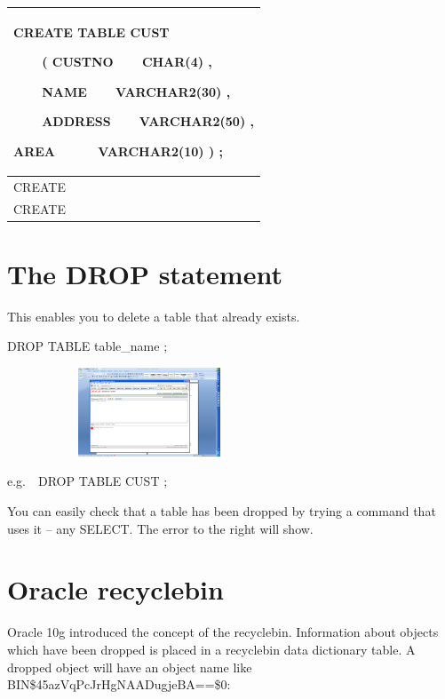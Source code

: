 \begin{flushleft}
\tablefirsthead{}
\tablehead{}
\tabletail{}
\tablelasttail{}
\begin{supertabular}{|m{14.663cm}|}
\hline
CREATE TABLE CUST

\ \ \ \ ( CUSTNO\ \ \ \ CHAR(4) ,

\ \ \ \  NAME\ \ \ \ VARCHAR2(30) ,

\ \ \ \  ADDRESS\ \ \ \ VARCHAR2(50) ,

AREA\ \ \ \ \ \ VARCHAR2(10)  ) ;

\\\hline
CREATE

\\\hline
CREATE

\\\hline
\end{supertabular}
\end{flushleft}
\section{The DROP statement}
This enables you to delete a table that already exists.

 DROP TABLE table\_name ;\ \ \ \ 



\begin{center}
  
\includegraphics[width=8.449cm,height=2.644cm]{images/img (41).png}

\end{center}
e.g.\ \ DROP TABLE CUST ;

You can easily check that a table has been dropped by trying a command that uses it -- any SELECT. The error to the right will show.

\section{Oracle recyclebin}
Oracle 10g introduced the concept of the recyclebin.  Information about objects which have been dropped is placed in a recyclebin data dictionary table.  A dropped object will have an object name like BIN\$45azVqPcJrHgNAADugjeBA==\$0: 

